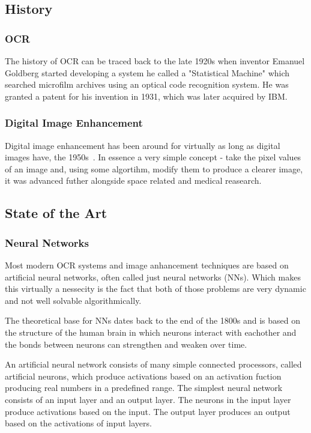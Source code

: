 \documentclass[12pt]{article}
\begin{document}
\subsection{History}

\subsubsection{OCR}

The history of OCR can be traced back to the late 1920s when inventor Emanuel Goldberg started developing a system he called a "Statistical Machine" which searched microfilm archives using an optical code recognition system. He was granted a patent for his invention in 1931, which was later acquired by IBM.~\cite{1838389}

\subsubsection{Digital Image Enhancement}

Digital image enhancement has been around for virtually as long as digital images have, the 1950s~\cite{dipanniversary}. In essence a very simple concept - take the pixel values of an image and, using some algortihm, modify them to produce a clearer image, it was advanced futher alongside space related and medical reasearch.~\cite{Rosenfeld}

\subsection{State of the Art}

\subsubsection{Neural Networks}

Most modern OCR systems and image anhancement techniques are based on artificial neural networks, often called just neural networks (NNs). Which makes this virtually a nessecity is the fact that both of those problems are very dynamic and not well solvable algorithmically.

The theoretical base for NNs dates back to the end of the 1800s and is based on the structure of the human brain in which neurons interact with eachother and the bonds between neurons can strengthen and weaken over time.~\cite{SCHMIDHUBER201585}

An artificial neural network consists of many simple connected processors, called artificial neurons, which produce activations based on an activation fuction producing real numbers in a predefined range. The simplest neural network consists of an input layer and an output layer. The neurons in the input layer produce activations based on the input. The output layer produces an output based on the activations of input layers.~\cite{SCHMIDHUBER201585}
\end{document}

